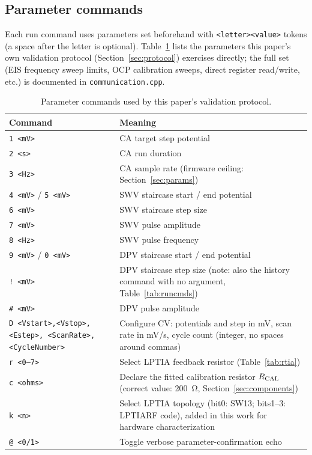\subsection{Parameter commands}
Each run command uses parameters set beforehand with
\texttt{<letter><value>} tokens (a space after the letter is optional).
Table~\ref{tab:paramcmds} lists the parameters this paper's own validation
protocol (Section~\ref{sec:protocol}) exercises directly; the full set
(EIS frequency sweep limits, OCP calibration sweeps, direct register
read/write, etc.) is documented in \texttt{communication.cpp}.

\begin{table}[H]
\centering
\footnotesize
\setlength{\tabcolsep}{4pt}
\caption{Parameter commands used by this paper's validation protocol.}
\label{tab:paramcmds}
\begin{tabular}{@{}p{2.4cm}p{9.1cm}@{}}
\toprule
Command & Meaning \\
\midrule
\texttt{1 <mV>} & CA target step potential \\
\texttt{2 <s>} & CA run duration \\
\texttt{3 <Hz>} & CA sample rate (firmware ceiling: Section~\ref{sec:params}) \\
\texttt{4 <mV>} / \texttt{5 <mV>} & SWV staircase start / end potential \\
\texttt{6 <mV>} & SWV staircase step size \\
\texttt{7 <mV>} & SWV pulse amplitude \\
\texttt{8 <Hz>} & SWV pulse frequency \\
\texttt{9 <mV>} / \texttt{0 <mV>} & DPV staircase start / end potential \\
\texttt{! <mV>} & DPV staircase step size (note: also the history
  command with no argument, Table~\ref{tab:runcmds}) \\
\texttt{\# <mV>} & DPV pulse amplitude \\
\texttt{D <Vstart>,\allowbreak<Vstop>,\allowbreak<Estep>,\allowbreak
  <ScanRate>,\allowbreak<CycleNumber>} & Configure CV: potentials and
  step in mV, scan rate in mV/s, cycle count (integer, no spaces around
  commas) \\
\texttt{r <0--7>} & Select LPTIA feedback resistor (Table~\ref{tab:rtia}) \\
\texttt{c <ohms>} & Declare the fitted calibration resistor $R_{\mathrm{CAL}}$
  (correct value: \SI{200}{\ohm}, Section~\ref{sec:components}) \\
\texttt{k <n>} & Select LPTIA topology (bit0: SW13; bits1--3: LPTIARF
  code), added in this work for hardware characterization \\
\texttt{@ <0/1>} & Toggle verbose parameter-confirmation echo \\
\bottomrule
\end{tabular}
\end{table}

